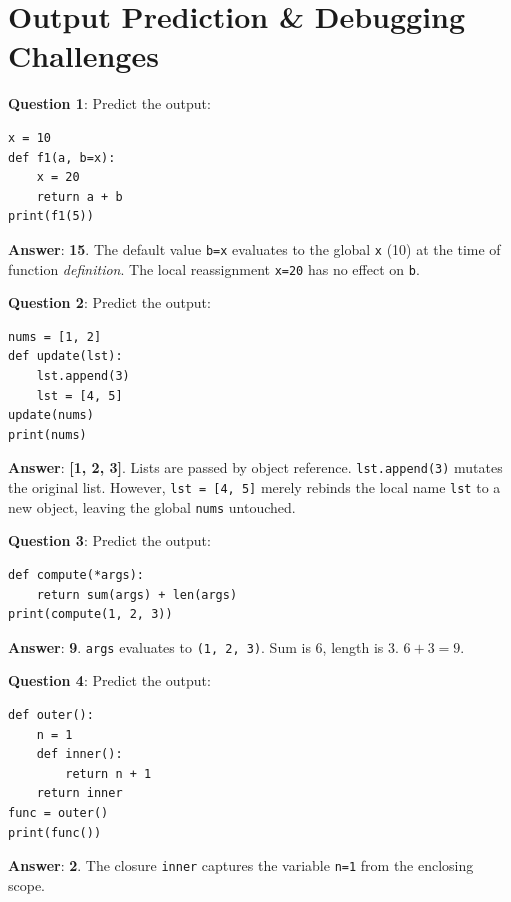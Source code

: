 \section{Output Prediction \& Debugging Challenges}

\begin{outputprediction}
\textbf{Question 1}: Predict the output:
\begin{lstlisting}[language=Python3]
x = 10
def f1(a, b=x):
    x = 20
    return a + b
print(f1(5))
\end{lstlisting}
\textbf{Answer}: \textbf{15}. The default value \texttt{b=x} evaluates to the global \texttt{x} (10) at the time of function \textit{definition}. The local reassignment \texttt{x=20} has no effect on \texttt{b}.
\end{outputprediction}

\begin{outputprediction}
\textbf{Question 2}: Predict the output:
\begin{lstlisting}[language=Python3]
nums = [1, 2]
def update(lst):
    lst.append(3)
    lst = [4, 5]
update(nums)
print(nums)
\end{lstlisting}
\textbf{Answer}: \textbf{[1, 2, 3]}. Lists are passed by object reference. \texttt{lst.append(3)} mutates the original list. However, \texttt{lst = [4, 5]} merely rebinds the local name \texttt{lst} to a new object, leaving the global \texttt{nums} untouched.
\end{outputprediction}

\begin{outputprediction}
\textbf{Question 3}: Predict the output:
\begin{lstlisting}[language=Python3]
def compute(*args):
    return sum(args) + len(args)
print(compute(1, 2, 3))
\end{lstlisting}
\textbf{Answer}: \textbf{9}. \texttt{args} evaluates to \texttt{(1, 2, 3)}. Sum is 6, length is 3. $6 + 3 = 9$.
\end{outputprediction}

\begin{outputprediction}[Closures]
\textbf{Question 4}: Predict the output:
\begin{lstlisting}[language=Python3]
def outer():
    n = 1
    def inner():
        return n + 1
    return inner
func = outer()
print(func())
\end{lstlisting}
\textbf{Answer}: \textbf{2}. The closure \texttt{inner} captures the variable \texttt{n=1} from the enclosing scope.
\end{outputprediction}

